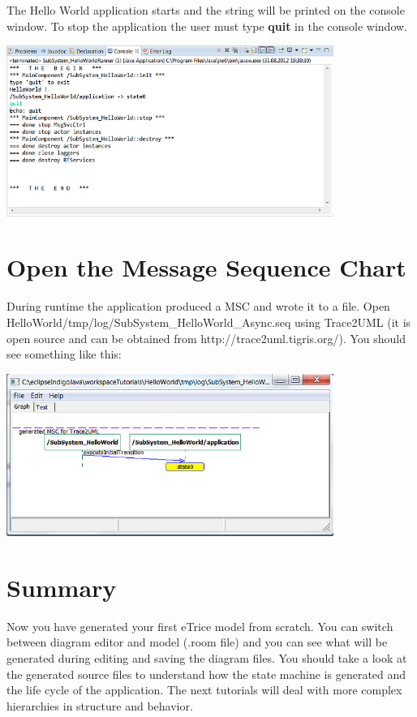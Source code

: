 The Hello World application starts and the string will be printed on the console window. To stop the 
application the user must type \textbf{quit} in the console window.

\includegraphics[width=0.8\textwidth]{images/015-HelloWorld08.png}

\section{Open the Message Sequence Chart}

During runtime the application produced a MSC and wrote it to a file. Open 
HelloWorld/tmp/log/SubSystem\_HelloWorld\_Async.seq using Trace2UML (it is open source and can be obtained 
from  http://trace2uml.tigris.org/). You should see something like this:

\includegraphics[width=0.8\textwidth]{images/015-HelloWorld09.png}


\section{Summary}

Now you have generated your first eTrice model from scratch. You can switch between diagram editor and 
model (.room file) and you can see what will be generated during editing and saving the diagram files. 
You should take a look at the generated source files to understand how the state machine is generated and 
the life cycle of the application. The next tutorials will deal with more complex hierarchies in structure 
and behavior.
